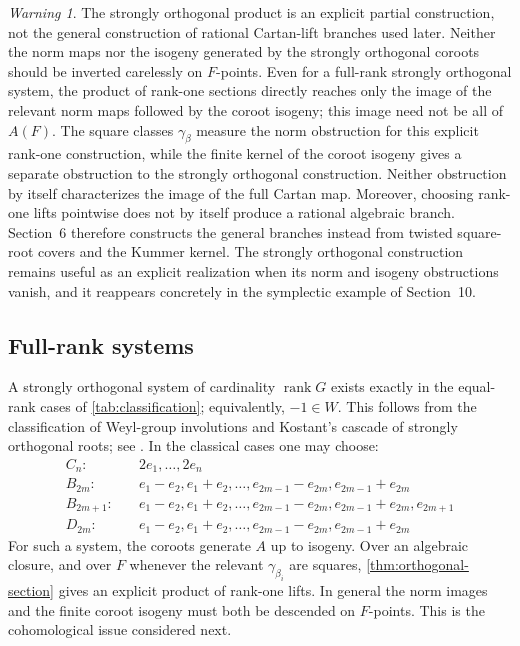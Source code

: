 \documentclass[11pt]{amsart}
\theoremstyle{definition}
\theoremstyle{remark}
\newtheorem{warning}[warning]{Warning}
\newcommand{\rank}{\operatorname{rank}}
\begin{document}
\begin{warning}\label{warn:not-descend}
The strongly orthogonal product is an explicit partial construction, not the
general construction of rational Cartan-lift branches used later.  Neither
the norm maps nor the isogeny generated by the strongly orthogonal coroots
should be inverted carelessly on $F$-points.  Even for a full-rank strongly
orthogonal system, the product of rank-one sections directly reaches only the
image of the relevant norm maps followed by the coroot isogeny; this image
need not be all of $A(F)$.  The square classes $\gamma_\beta$ measure the
norm obstruction for this explicit rank-one construction, while the finite
kernel of the coroot isogeny gives a separate obstruction to the strongly
orthogonal construction.  Neither obstruction by itself characterizes the
image of the full Cartan map.  Moreover, choosing rank-one lifts pointwise
does not by itself produce a rational algebraic branch.  Section~6 therefore
constructs the general branches instead from twisted square-root covers and
the Kummer kernel.  The strongly orthogonal construction remains useful as an
explicit realization when its norm and isogeny obstructions vanish, and it
reappears concretely in the symplectic example of Section~10.
\end{warning}

\subsection{Full-rank systems}
A strongly orthogonal system of cardinality $\rank G$ exists exactly in the
equal-rank cases of \cref{tab:classification}; equivalently, $-1\in W$.
This follows from the classification of Weyl-group involutions and Kostant's
cascade of strongly orthogonal roots; see \cite{Carter,KostantCascade}.
In the classical cases one may choose:
\begin{align*}
 C_n:&\quad 2e_1,\ldots,2e_n\\
 B_{2m}:&\quad e_1-e_2,e_1+e_2,\ldots,
              e_{2m-1}-e_{2m},e_{2m-1}+e_{2m}\\
 B_{2m+1}:&\quad e_1-e_2,e_1+e_2,\ldots,
              e_{2m-1}-e_{2m},e_{2m-1}+e_{2m},e_{2m+1}\\
 D_{2m}:&\quad e_1-e_2,e_1+e_2,\ldots,
              e_{2m-1}-e_{2m},e_{2m-1}+e_{2m}
\end{align*}
For such a system, the coroots generate $A$ up to isogeny.  Over an
algebraic closure, and over $F$ whenever the relevant
$\gamma_{\beta_i}$ are squares, \cref{thm:orthogonal-section} gives an
explicit product of rank-one lifts.  In general the norm images and the
finite coroot isogeny must both be descended on $F$-points.  This is the
cohomological issue considered next.
\end{document}
